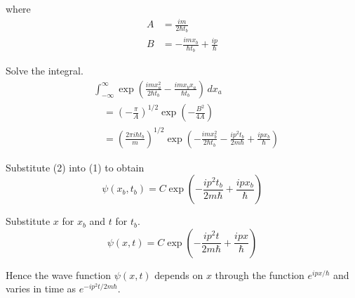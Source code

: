 \documentclass[12pt]{article}
\begin{document}
where
\begin{align*}
A&=\frac{im}{2\hbar t_b}
\\
B&=-\frac{imx_b}{\hbar t_b}+\frac{ip}{\hbar}
\end{align*}

Solve the integral.
\begin{align*}
&\int_{-\infty}^\infty
\exp\left(\frac{imx_a^2}{2\hbar t_b}-\frac{imx_bx_a}{\hbar t_b}\right)\,dx_a
\\
&\quad{}=\left(-\frac{\pi}{A}\right)^{1/2}\exp\left(-\frac{B^2}{4A}\right)
\\
&\quad{}=\left(\frac{2\pi i\hbar t_b}{m}\right)^{1/2}
\exp\left(-\frac{i m x_b^2}{2\hbar t_b}-\frac{ip^2t_b}{2m\hbar}+\frac{ipx_b}{\hbar}\right)
\tag{2}
\end{align*}

Substitute (2) into (1) to obtain
\begin{equation*}
\psi(x_b,t_b)
=C\exp\left(-\frac{ip^2t_b}{2m\hbar}+\frac{ipx_b}{\hbar}\right)
\end{equation*}

Substitute $x$ for $x_b$ and $t$ for $t_b$.
\begin{equation*}
\psi(x,t)
=C\exp\left(-\frac{ip^2t}{2m\hbar}+\frac{ipx}{\hbar}\right)
\end{equation*}

Hence the wave function $\psi(x,t)$ depends on $x$ through the
function $e^{ipx/\hbar}$ and varies in time as
$e^{-ip^2t/2m\hbar}$.
\end{document}
